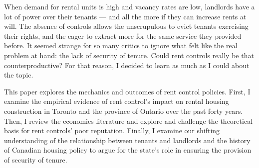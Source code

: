 When demand for rental units is high and vacancy rates are low, landlords have a lot of power over their tenants --- and all the more if they can increase rents at will. The absence of controls allows the unscrupulous to evict tenants exercising their rights, and the eager to extract more for the same service they provided before. It seemed strange for so many critics to ignore what felt like the real problem at hand: the lack of security of tenure. Could rent controls really be that counterproductive? For that reason, I decided to learn as much as I could about the topic.

This paper explores the mechanics and outcomes of rent control policies. First, I examine the empirical evidence of rent control's impact on rental housing construction in Toronto and the province of Ontario over the past forty years. Then, I review the economics literature and explore and challenge the theoretical basis for rent controls' poor reputation. Finally, I examine our shifting understanding of the relationship between tenants and landlords and the history of Canadian housing policy to argue for the state's role in ensuring the provision of security of tenure.




